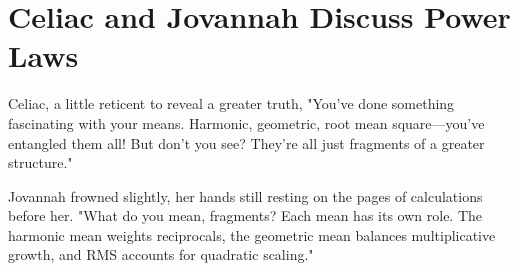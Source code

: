 % 
% 
% 
% 
% 
\section*{Celiac and Jovannah Discuss Power Laws}

\smallskip \noindent
Celiac, a little reticent to reveal a greater truth, "You’ve done something fascinating with your means. Harmonic, geometric, root mean square—you’ve entangled them all! But don’t you see? They’re all just fragments of a greater structure."

\smallskip \noindent
Jovannah frowned slightly, her hands still resting on the pages of calculations before her. "What do you mean, fragments? Each mean has its own role. The harmonic mean weights reciprocals, the geometric mean balances multiplicative growth, and RMS accounts for quadratic scaling."

